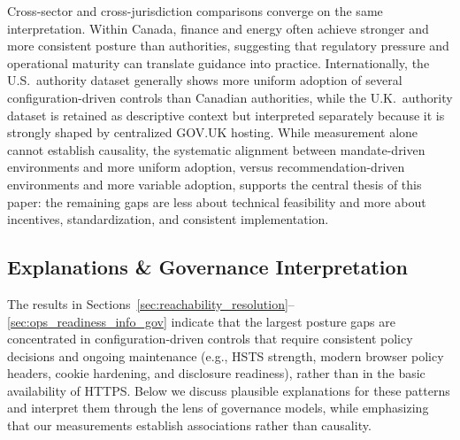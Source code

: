 \documentclass[a4paper,fleqn]{cas-sc}
\begin{document}
    Cross-sector and cross-jurisdiction comparisons converge on the same interpretation. 
    Within Canada, finance and energy often achieve stronger and more consistent posture than authorities, suggesting that regulatory pressure and operational maturity can translate guidance into practice. 
    Internationally, the U.S.\ authority dataset generally shows more uniform adoption of several configuration-driven controls than Canadian authorities, while the U.K.\ authority dataset is retained as descriptive context but interpreted separately because it is strongly shaped by centralized GOV.UK hosting.
    While measurement alone cannot establish causality, the systematic alignment between mandate-driven environments and more uniform adoption, versus recommendation-driven environments and more variable adoption, supports the central thesis of this paper: the remaining gaps are less about technical feasibility and more about incentives, standardization, and consistent implementation.

\subsection{Explanations \& Governance Interpretation}\label{sec:explanations_governance}

    The results in Sections~\ref{sec:reachability_resolution}--\ref{sec:ops_readiness_info_gov} indicate that the largest posture gaps are concentrated in configuration-driven controls that require consistent policy decisions and ongoing maintenance (e.g., HSTS strength, modern browser policy headers, cookie hardening, and disclosure readiness), rather than in the basic availability of HTTPS. 
    Below we discuss plausible explanations for these patterns and interpret them through the lens of governance models, while emphasizing that our measurements establish associations rather than causality.
\end{document}
